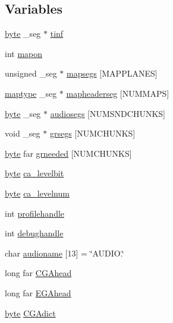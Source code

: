 \subsection*{Variables}
\begin{DoxyCompactItemize}
\item 
\hyperlink{ID__HEAD_8H_a0c8186d9b9b7880309c27230bbb5e69d}{byte} \_\-seg $\ast$ \hyperlink{ID__CA_8C_ac7ecffe82882a03457d1244cff842063}{tinf}
\item 
int \hyperlink{ID__CA_8C_a9bc2aa6f5318e11111d85d1f526f4ed9}{mapon}
\item 
unsigned \_\-seg $\ast$ \hyperlink{ID__CA_8C_aa491c919acbb7c3a3626dc79014b7b7b}{mapsegs} \mbox{[}MAPPLANES\mbox{]}
\item 
\hyperlink{structmaptype}{maptype} \_\-seg $\ast$ \hyperlink{ID__CA_8C_a4fa58ff79559a7ff81611311489c8e70}{mapheaderseg} \mbox{[}NUMMAPS\mbox{]}
\item 
\hyperlink{ID__HEAD_8H_a0c8186d9b9b7880309c27230bbb5e69d}{byte} \_\-seg $\ast$ \hyperlink{ID__CA_8C_a6a31b9ada480b861c1ed6f0276bda609}{audiosegs} \mbox{[}NUMSNDCHUNKS\mbox{]}
\item 
void \_\-seg $\ast$ \hyperlink{ID__CA_8C_aa0e5c34b0901c8cc15a60fe57cb09b3a}{grsegs} \mbox{[}NUMCHUNKS\mbox{]}
\item 
\hyperlink{ID__HEAD_8H_a0c8186d9b9b7880309c27230bbb5e69d}{byte} far \hyperlink{ID__CA_8C_aff6ae5a74b0467508c14a3f3b91ffd90}{grneeded} \mbox{[}NUMCHUNKS\mbox{]}
\item 
\hyperlink{ID__HEAD_8H_a0c8186d9b9b7880309c27230bbb5e69d}{byte} \hyperlink{ID__CA_8C_af4f718356e28be31a81ef4df1a2f7c96}{ca\_\-levelbit}
\item 
\hyperlink{ID__HEAD_8H_a0c8186d9b9b7880309c27230bbb5e69d}{byte} \hyperlink{ID__CA_8C_a2010805bcd6b7bda525f99d095cbf380}{ca\_\-levelnum}
\item 
int \hyperlink{ID__CA_8C_ad1a5984b9f9fb82e3d9fdc3e79bdb5d0}{profilehandle}
\item 
int \hyperlink{ID__CA_8C_a63f7bed9e587f57ce6912f20d2fb4f87}{debughandle}
\item 
char \hyperlink{ID__CA_8C_aedfaf0a69707063299a02a1af291edc1}{audioname} \mbox{[}13\mbox{]} = \char`\"{}AUDIO.\char`\"{}
\item 
long far \hyperlink{ID__CA_8C_a840bfedccb4af45be5e8596f1baa84fb}{CGAhead}
\item 
long far \hyperlink{ID__CA_8C_a064aa90a57944a1d8611fcedfef36eb3}{EGAhead}
\item 
\hyperlink{ID__HEAD_8H_a0c8186d9b9b7880309c27230bbb5e69d}{byte} \hyperlink{ID__CA_8C_a97afbec4a1e2c2070e62aafe8582f891}{CGAdict}

\end{DoxyCompactItemize}
